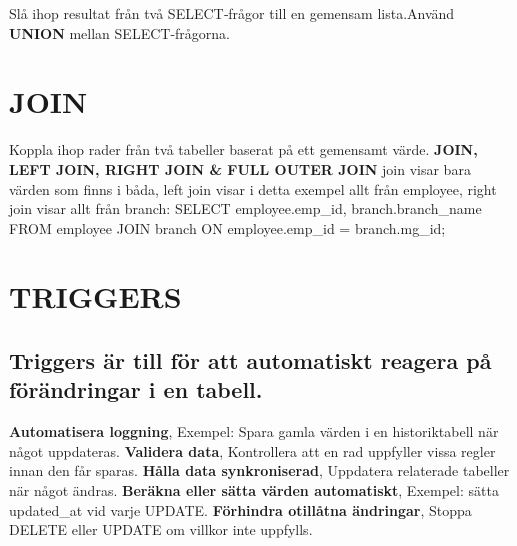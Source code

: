 \documentclass[
]{article}
\begin{document}
Slå ihop resultat från två SELECT‑frågor till en gemensam lista.Använd
\textbf{UNION} mellan SELECT-frågorna.

\section{JOIN}\label{join}

Koppla ihop rader från två tabeller baserat på ett gemensamt värde.
\textbf{JOIN, LEFT JOIN, RIGHT JOIN \& FULL OUTER JOIN} join visar bara
värden som finns i båda, left join visar i detta exempel allt från
employee, right join visar allt från branch: SELECT employee.emp\_id,
branch.branch\_name FROM employee JOIN branch ON employee.emp\_id =
branch.mg\_id;

\section{TRIGGERS}\label{triggers}

\subsection{Triggers är till för att automatiskt reagera på förändringar
i en
tabell.}\label{triggers-uxe4r-till-fuxf6r-att-automatiskt-reagera-puxe5-fuxf6ruxe4ndringar-i-en-tabell.}

\textbf{Automatisera loggning}, Exempel: Spara gamla värden i en
historiktabell när något uppdateras. \textbf{Validera data}, Kontrollera
att en rad uppfyller vissa regler innan den får sparas. \textbf{Hålla
data synkroniserad}, Uppdatera relaterade tabeller när något ändras.
\textbf{Beräkna eller sätta värden automatiskt}, Exempel: sätta
updated\_at vid varje UPDATE. \textbf{Förhindra otillåtna ändringar},
Stoppa DELETE eller UPDATE om villkor inte uppfylls.
\end{document}
